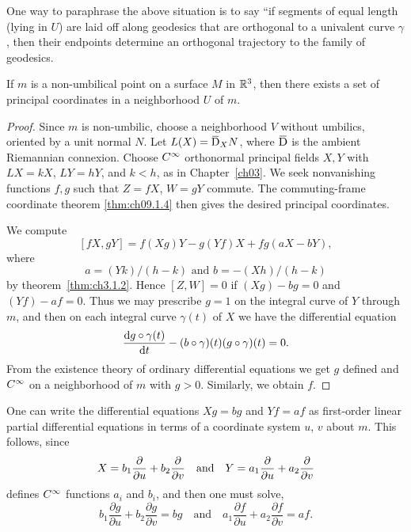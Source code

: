 \documentclass[../main]{subfiles}
\begin{document}
One way to paraphrase the above situation is to say ``if segments of equal length (lying in $U$) are laid off along geodesics that are orthogonal to a univalent curve $\gamma$, then their endpoints determine an orthogonal trajectory to the family of geodesics.



\begin{theorem} \label{thm:ch9.5.2}
    If $m$ is a non-umbilical point on a surface $M$ in $\mathbb{R}^3$, then there exists a set of principal coordinates in a neighborhood $U$ of $m$.
\end{theorem}

\begin{proof}
    Since $m$ is non-umbilic, choose a neighborhood $V$ without umbilics, oriented by a unit normal $N$. Let $L(X)=\covariant_XN$, where $\covariant$ is the ambient Riemannian connexion. Choose $C^\infty$ orthonormal principal fields $X,Y$ with $LX=kX$, $LY=hY$, and $k<h$, as in Chapter~\ref{ch03}. We seek nonvanishing functions $f,g$ such that $Z=fX$, $W=gY$ commute. The commuting-frame coordinate theorem \ref{thm:ch09.1.4} then gives the desired principal coordinates.

    We compute \[[fX, gY] = f(Xg)Y - g(Yf)X + fg(aX - bY),\] where \[a = (Yk)/(h - k)\text{ and }b = -(Xh)/(h - k)\]by theorem~\ref{thm:ch3.1.2}. Hence $[Z, W] = 0$ if $(Xg) - bg = 0$ and $(Yf) - af = 0$. Thus we may prescribe $g = 1$ on the integral curve of $Y$ through $m$, and then on each integral curve $\gamma(t)$ of $X$ we have the differential equation
    \[ \dfrac{\mathrm{d}g \circ \gamma(t)}{\mathrm{d}t} - (b \circ \gamma)(t)(g \circ \gamma)(t) = 0\text{.} \]
    From the existence theory of ordinary differential equations we get $g$ defined and $C^\infty$ on a neighborhood of $m$ with $g > 0$. Similarly, we obtain $f$.
\end{proof}



One can write the differential equations $Xg = bg$ and $Yf = af$ as first-order linear partial differential equations in terms of a coordinate system $u$, $v$ about $m$. This follows, since 
\begin{equation*}
   X = b_1 \dfrac{\partial }{\partial u}+b_2 \dfrac{\partial }{\partial v}\quad\text{and}\quad Y= a_1 \dfrac{\partial }{\partial u}+a_2\dfrac{\partial }{\partial v}
\end{equation*}
defines $C^\infty$ functions $a_i$ and $b_i$, and then one must solve,
\[ b_1\frac{\partial g}{\partial u} + b_2\frac{\partial g}{\partial v} = bg \quad\text{and}\quad a_1\frac{\partial f}{\partial u} + a_2\frac{\partial f}{\partial v} = af\text{.} \]
\end{document}
